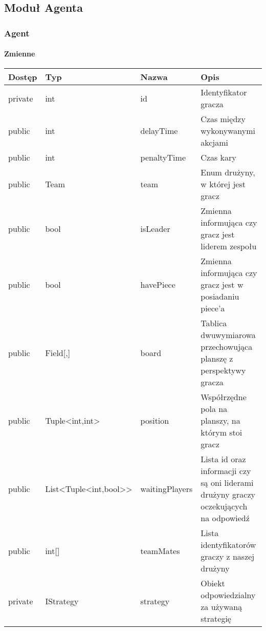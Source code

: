 \documentclass[../Dokumentacja.tex]{subfiles}
\begin{document}
\subsection{Moduł Agenta}
\subsubsection{Agent}
\paragraph{Zmienne}
\begin{center}
    \begin{tabular}{ | l | l | l | p{5cm} |}
    \hline
    Dostęp & Typ & Nazwa & Opis \\ \hline
    private & int & id & Identyfikator gracza \\ \hline
    public & int & delayTime & Czas między wykonywanymi akcjami \\ \hline
    public & int & penaltyTime & Czas kary \\ \hline
    public & Team & team & Enum drużyny, w której jest gracz \\ \hline
    public & bool & isLeader & Zmienna informująca czy gracz jest liderem zespołu \\ \hline
    public & bool & havePiece & Zmienna informująca czy gracz jest w posiadaniu piece'a \\ \hline
    public & Field[,] & board & Tablica dwuwymiarowa przechowująca planszę z perspektywy gracza \\ \hline
    public & Tuple<int,int> & position & Współrzędne pola na planszy, na którym stoi gracz \\ \hline
    public & List<Tuple<int,bool>> & waitingPlayers & Lista id oraz
    informacji czy są oni liderami drużyny graczy oczekujących na odpowiedź \\ \hline
    public & int[] & teamMates & Lista identyfikatorów graczy z naszej drużyny \\ \hline
    private & IStrategy & strategy & Obiekt odpowiedzialny za używaną strategię \\ \hline
    \end{tabular}
\end{center}
\end{document}
